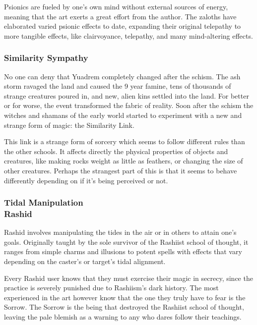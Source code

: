Psionics are fueled by one's own mind without external sources of energy, meaning that the art exerts a great effort from the author.
The zaloths have elaborated varied psionic effects to date, expanding their original telepathy to more tangible effects, like clairvoyance, telepathy, and many mind-altering effects.

\subsubsection{Similarity Sympathy}

No one can deny that Yuadrem completely changed after the schism.
The ash storm ravaged the land and caused the 9 year famine, tens of thousands of strange creatures poured in, and new, alien kins settled into the land.
For better or for worse, the event transformed the fabric of reality.
Soon after the schism the witches and shamans of the early world started to experiment with a new and strange form of magic: the Similarity Link.

This link is a strange form of sorcery which seems to follow different rules than the other schools.
It affects directly the physical properties of objects and creatures, like making rocks weight as little as feathers, or changing the size of other creatures.
Perhaps the strangest part of this is that it seems to behave differently depending on if it's being perceived or not.%

\subsubsection{Tidal Manipulation\\ \small{Rashid}} %
Rashid involves manipulating the tides in the air or in others to attain one's goals.
Originally taught by the sole survivor of the Rashiist school of thought, it ranges from simple charms and illusions to potent spells with effects that vary depending on the caster's or target's tidal alignment.

Every Rashid user knows that they must exercise their magic in secrecy, since the practice is severely punished due to Rashiism's dark history.
The most experienced in the art however know that the one they truly have to fear is the Sorrow.
The Sorrow is the being that destroyed the Rashiist school of thought, leaving the pale blemish as a warning to any who dares follow their teachings.

